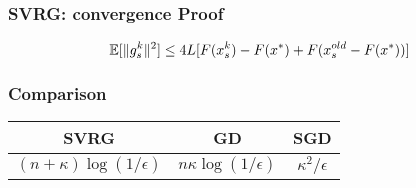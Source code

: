 \documentclass[aspectratio=149]{beamer}
\begin{document}
\begin{frame}
  \frametitle{SVRG: convergence Proof}
  \begin{lemma}%
    \begin{equation}
      \mathbb{E}[\Vert g_s^k \Vert^2] \le 4L [ F(x_s^k)- F(x^*) + F(x_s^{old}-F(x^*)) ]
    \end{equation}

  \end{lemma}

\end{frame}


\begin{frame}
  \frametitle{Comparison}


  \begin{tabular}{c | c | c}
    SVRG  & GD & SGD \\
    \hline
 $(n + \kappa) \log(1/\epsilon)$ & $n \kappa \log(1/\epsilon)$ & $\kappa^2 / \epsilon$
  \end{tabular}


\end{frame}

\end{document}
